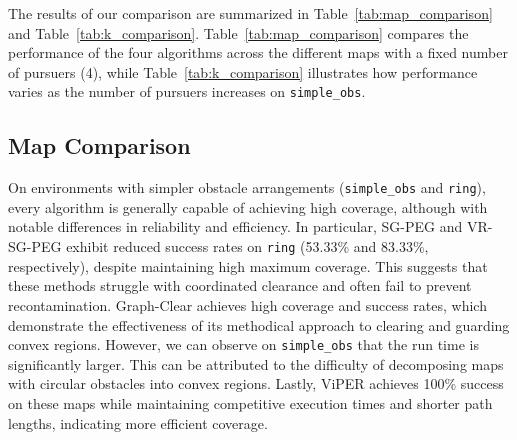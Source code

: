 \documentclass[conference]{IEEEtran}
\begin{document}




The results of our comparison are summarized in Table~\ref{tab:map_comparison} and Table~\ref{tab:k_comparison}. Table~\ref{tab:map_comparison} compares the performance of the four algorithms across the different maps with a fixed number of pursuers (4), while Table~\ref{tab:k_comparison} illustrates how performance varies as the number of pursuers increases on \texttt{simple\_obs}.

\subsection{Map Comparison}
On environments with simpler obstacle arrangements (\texttt{simple\_obs} and \texttt{ring}), every algorithm is generally capable of achieving high coverage, although with notable differences in reliability and efficiency. In particular, SG-PEG and VR-SG-PEG exhibit reduced success rates on \texttt{ring} (53.33\% and 83.33\%, respectively), despite maintaining high maximum coverage. This suggests that these methods struggle with coordinated clearance and often fail to prevent recontamination. Graph-Clear achieves high coverage and success rates, which demonstrate the effectiveness of its methodical approach to clearing and guarding convex regions. However, we can observe on \texttt{simple\_obs} that the run time is significantly larger. This can be attributed to the difficulty of decomposing maps with circular obstacles into convex regions. Lastly, ViPER achieves 100\% success on these maps while maintaining competitive execution times and shorter path lengths, indicating more efficient coverage.
\end{document}
